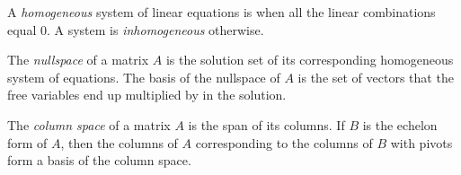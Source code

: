 \begin{definition}
	A \emph{homogeneous} system of linear equations is when all the linear
	combinations equal 0. A system is \emph{inhomogeneous} otherwise.
\end{definition}

\begin{definition}
	The \emph{nullspace} of a matrix $A$ is the solution set of its
	corresponding homogeneous system of equations. The basis of the nullspace
	of $A$ is the set of vectors that the free variables end up multiplied by in
	the solution.
\end{definition}

\begin{definition}
	The \emph{column space} of a matrix $A$ is the span of its columns. If $B$ is
	the echelon form of $A$, then the columns of $A$ corresponding to the
	columns of $B$ with pivots form a basis of the column space.
\end{definition}
